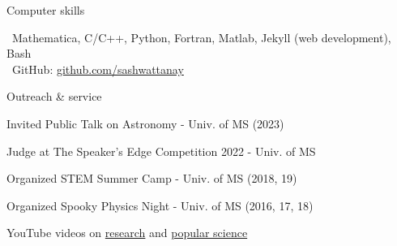 \documentclass{resume} %
\begin{document}
   

\begin{rSection}{Computer skills}



\textbullet~Mathematica, C/C++, Python, Fortran, Matlab, Jekyll (web development), Bash  \\
\textbullet~GitHub: \href{https://github.com/sashwattanay}{github.com/sashwattanay}



\end{rSection}




\begin{rSection}{Outreach \& service}

Invited Public Talk on Astronomy - Univ. of MS (2023)

Judge at The Speaker’s Edge Competition 2022 - Univ. of MS

Organized STEM Summer Camp - Univ. of MS  (2018, 19)  

Organized Spooky Physics Night - Univ. of MS (2016, 17, 18) 

YouTube videos on \href{https://youtu.be/aoiCk5TtmvE}{research} and \href{https://youtu.be/K8ms_4SJh9Q}{popular science} 
 
 



\end{rSection}



\iffalse
\begin{rSection}{Languages}


\textbf{Native:} Hindi; \textbf{Fluent:} English;
\textbf{Elementary:} French


\end{rSection}
\fi



\iffalse
\end{document}
